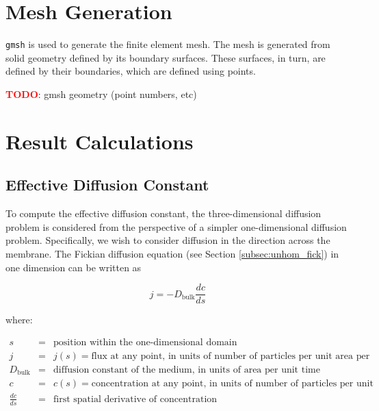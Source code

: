\documentclass{article}
\begin{document}
\section{Mesh Generation}\label{sec:meshgen}

\texttt{gmsh} is used to generate the finite element mesh.
The mesh is generated from solid geometry defined by its boundary surfaces.
These surfaces, in turn, are defined by their boundaries,
which are defined using points.

\textcolor{red}{\textbf{TODO}}: gmsh geometry (point numbers, etc)

\section{Result Calculations}

\subsection{Effective Diffusion Constant}\label{subsec:D_eff}

To compute the effective diffusion constant,
the three-dimensional diffusion problem is considered from the perspective of a simpler one-dimensional diffusion problem.
Specifically, we wish to consider diffusion in the direction across the membrane.
The Fickian diffusion equation (see Section \ref{subsec:unhom_fick}) in one dimension can be written as

\begin{equation}
j = - D_{\mathrm{bulk}} \frac{dc}{ds}
\end{equation}

where:

$\begin{array}{rcl}
s & = & \text{position within the one-dimensional domain} \\
j & = & j(s) = \text{flux at any point, in units of number of particles per unit area per unit time} \\
D_{\text{bulk}} & = & \text{diffusion constant of the medium, in units of area per unit time} \\
c & = & c(s) = \text{concentration at any point, in units of number of particles per unit volume} \\
\frac{dc}{ds} & = & \text{first spatial derivative of concentration}
\end{array}$
\end{document}
